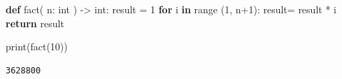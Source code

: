 \documentclass[
  11pt,
  a4paper,
  DIV=11,
  numbers=noendperiod]{scrartcl}
\newenvironment{Shaded}{\begin{snugshade}}{\end{snugshade}}
\newcommand{\BuiltInTok}[1]{\textcolor[rgb]{0.00,0.23,0.31}{#1}}
\newcommand{\ControlFlowTok}[1]{\textcolor[rgb]{0.00,0.23,0.31}{\textbf{#1}}}
\newcommand{\DecValTok}[1]{\textcolor[rgb]{0.68,0.00,0.00}{#1}}
\newcommand{\KeywordTok}[1]{\textcolor[rgb]{0.00,0.23,0.31}{\textbf{#1}}}
\newcommand{\NormalTok}[1]{\textcolor[rgb]{0.00,0.23,0.31}{#1}}
\newcommand{\OperatorTok}[1]{\textcolor[rgb]{0.37,0.37,0.37}{#1}}
\begin{document}
\begin{Shaded}
\begin{Highlighting}[numbers=left,,]
\KeywordTok{def}\NormalTok{ fact(}
\NormalTok{        n: }\BuiltInTok{int} 
\NormalTok{        ) }\OperatorTok{{-}\textgreater{}} \BuiltInTok{int}\NormalTok{:}
\NormalTok{    result }\OperatorTok{=} \DecValTok{1}
    \ControlFlowTok{for}\NormalTok{ i }\KeywordTok{in} \BuiltInTok{range}\NormalTok{ (}\DecValTok{1}\NormalTok{, n}\OperatorTok{+}\DecValTok{1}\NormalTok{):}
\NormalTok{        result}\OperatorTok{=}\NormalTok{ result }\OperatorTok{*}\NormalTok{ i}
    \ControlFlowTok{return}\NormalTok{ result}
\end{Highlighting}
\end{Shaded}

\begin{Shaded}
\begin{Highlighting}[numbers=left,,]
\BuiltInTok{print}\NormalTok{(fact(}\DecValTok{10}\NormalTok{))}
\end{Highlighting}
\end{Shaded}

\begin{verbatim}
3628800
\end{verbatim}
\end{document}
